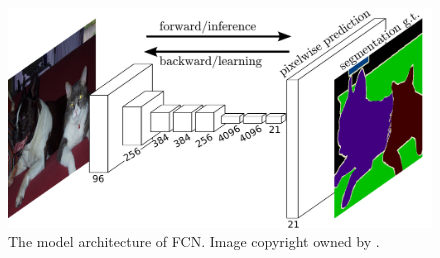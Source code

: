 \begin{figure}[!h]
	\centering
	\includegraphics[width=\figfi\textwidth]{2-04.pdf}
    \caption[The model architecture of FCN]{The model architecture of FCN. Image copyright owned by \cite{fcn}.}
    \label{fig:mdlfcn}
\end{figure}